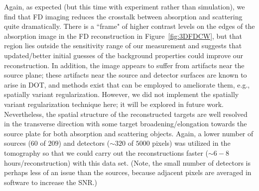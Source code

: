 Again, as expected (but this time with experiment rather than simulation), we find that FD imaging reduces the crosstalk between absorption and scattering quite dramatically. There is a ``frame" of higher contrast levels on the edges of the absorption image in the FD reconstruction in Figure~\ref{fig:3DFDCW}, but that region lies outside the sensitivity range of our measurement and suggests that updated/better initial guesses of the background properties could improve our reconstruction. In addition, the image appears to suffer from artifacts near the source plane; these artifacts near the source and detector surfaces are known to arise in DOT, and methods exist that can be employed to ameliorate them, e.g., spatially variant regularization. However, we did not implement the spatially variant regularization technique here; it will be explored in future work. Nevertheless, the spatial structure of the reconstructed targets are well resolved in the transverse direction with some target broadening/elongation towards the source plate for both absorption and scattering objects. Again, a lower number of sources ($60$ of $209$) and detectors ($\sim320$ of $5000$ pixels) was utilized in the tomography so that we could carry out the reconstructions faster ($\sim6-8$ hours/reconstruction) with this data set. (Note, the small number of detectors is perhaps less of an issue than the sources, because adjacent pixels are averaged in software to increase the SNR.)

